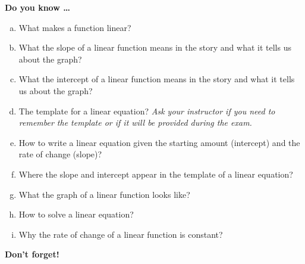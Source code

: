 \newpage



\bigskip

\noindent \textbf{Do you know \ldots} %

\begin{enumerate} [(a)]
\item What makes a function linear? 
\item What the slope of a linear function means in the story and what it tells us about the graph? 
\item What the intercept of a linear function means in the story and what it tells us about the graph? 
\item The template for a linear equation?  \emph{Ask your instructor if you need to remember the template or if it will be provided during the exam.}
\item How to write a linear equation given the starting amount (intercept) and the rate of change (slope)?   
\item Where the slope and intercept appear in the template of a linear equation? 
\item What the graph of a linear function looks like? 
\item How to solve a linear equation?  
\item Why the rate of change of a linear function is constant?  
\end{enumerate}

\bigskip

\noindent \textbf{Don't forget!}
